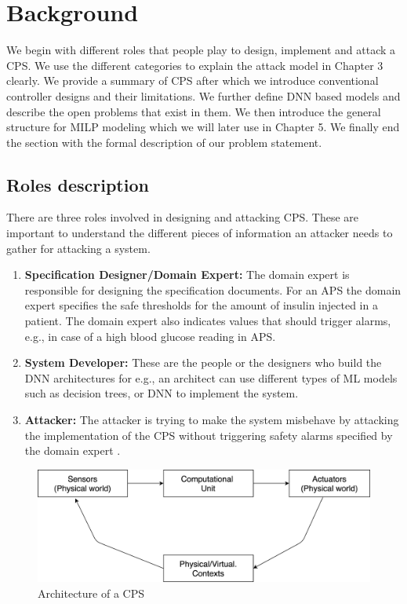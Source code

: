 \chapter{Background}
\label{ch:Chapter2}

We begin with different roles that people play to design, implement and attack a \ac{CPS}. We use the different categories to explain the attack model in Chapter 3 clearly. 
We provide a summary of \ac{CPS} after which we introduce conventional controller designs and their limitations. 
We further define \ac{DNN} based models and describe the open problems that exist in them. 
We then introduce the  general structure for \ac{MILP} modeling which we will later use in Chapter 5. 
We finally end the section with the formal description of our problem statement.

\section{Roles description}
There are three roles involved in designing and attacking \ac{CPS}. These are important to understand the different pieces of information an attacker needs to gather for attacking a system.

\begin{enumerate}
	\item \textbf{Specification Designer/Domain Expert:} The domain expert is responsible for designing the specification documents. 
	For an \ac{APS} the domain expert specifies the safe thresholds for the amount of insulin injected in a patient. The domain expert also indicates values that should trigger alarms, e.g., in case of a high blood glucose reading in \ac{APS}.
	\item \textbf{System Developer:} These are the people or the designers who
	build the \ac{DNN} architectures for e.g., an architect can use different types of \ac{ML} models such as decision trees, or \ac{DNN} to implement the system.
	\item \textbf{Attacker:} The attacker is trying to make the system misbehave by attacking the implementation of the \ac{CPS} without triggering safety alarms specified by the domain expert . 
\end{enumerate}

\begin{figure}
	\centering
	\includegraphics[width=0.7\linewidth]{Images/Systemsdescription}
	\caption{Architecture of a CPS}
	\label{fig:systemsdescription}
\end{figure}

